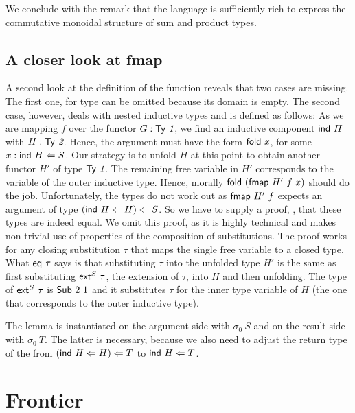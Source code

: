 \documentclass[a4paper,USenglish,cleveref, autoref, thm-restate]{lipics-v2021}
\begin{document}
We conclude with the remark that the language is sufficiently rich to
express the commutative monoidal structure of sum and product types.

\subsection{A closer look at fmap}
\label{sec:closer-look-at}

A second look at the definition of the {\Afmap} function reveals that
two cases are missing. The first one, for type {\ATZ} can be omitted
because its domain is empty. The second case, however, deals with
nested inductive types and is defined as follows:
\ccFunFmapSignature
\ccFunFmapInd
As we are mapping $f$ over the functor $G : \ATy{~1}$, we find an
inductive component $\Aind~H$ with $H : \ATy{~2}$. Hence, the argument
must have the form $\Afold\ x$, for some $x : \Aind~H \Leftarrow S$.
Our strategy is to unfold $H$ at this point to obtain another functor
$H'$ of type $\ATy{~1}$. The remaining free variable in $H'$
corresponds to the variable of the outer inductive type. Hence,
morally $\Afold~ (\Afmap~H'~f~x)$ should do the job. Unfortunately,
the types do not work out as $\Afmap~H'~f$ expects an argument of type
$(\Aind~H \Leftarrow H) \Leftarrow S$. So we have to supply a proof,
\Aeq, that these types are indeed equal.
We omit this proof, as it is highly technical and makes non-trivial
use of properties of the composition of substitutions.
The proof works for any closing substitution $\tau$ that maps the
single free variable to a closed type. What {$\Aeq~\tau$} says is 
that substituting $\tau$ into the unfolded type $H'$ is the same as
first substituting $\Aext^S\ \tau$, the extension of $\tau$, into
$H$ and then unfolding. The type of $\Aext^S\ \tau$ is $\ASub~2~1$ and
it substitutes $\tau$ for the inner type variable of $H$ (the one that
corresponds to the outer inductive type). 

The {\Aeq} lemma is instantiated on the argument side with $\sigma_0~S$ and on the result
side with $\sigma_0~T$. The latter is necessary, because we also need
to adjust the return type of the {\Afmap} from $(\Aind~H \Leftarrow H)
\Leftarrow T$ to $\Aind~H \Leftarrow T$. 




\section{Frontier}
\end{document}
